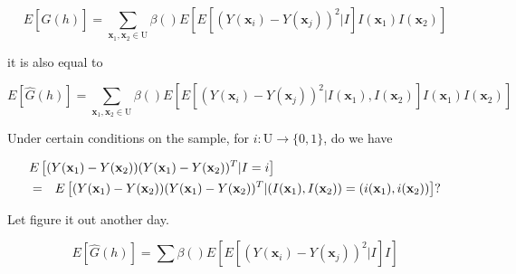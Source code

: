 \documentclass[12pt]{article}
\theoremstyle{definition}
\theoremstyle{remark}
\newcommand{\Pop}{\mathrm{U}}
\newcommand{\position}{\mathbf{x}}
\begin{document}
\begin{equation}
    E[\hat{G}(h)]=\sum_{\position_1,\position_2\in \Pop}{\beta()E\left[E\left[(Y(\mathbf{x}_{i})-Y(\mathbf{x}_{j}))^{2}|I\right]I(\position_1)I(\position_2)\right]}
\end{equation}

it is also equal to 


\begin{equation}
    E[\hat{G}(h)]=\sum_{\position_1,\position_2\in \Pop}{\beta()E\left[E\left[(Y(\mathbf{x}_{i})-Y(\mathbf{x}_{j}))^{2}|I(\position_1),I(\position_2)\right]I(\position_1)I(\position_2)\right]}
\end{equation}


Under certain conditions on the sample, for $i:\Pop\to\{0,1\}$, do we have 

\begin{eqnarray*}
\lefteqn{E\left[(Y(\mathbf{x}_{1})-Y(\mathbf{x}_{2}))(Y(\mathbf{x}_{1})-Y(\mathbf{x}_{2}))^T|I=i\right]}\\
&=&
E\left[(Y(\mathbf{x}_{1})-Y(\mathbf{x}_{2}))(Y(\mathbf{x}_{1})-Y(\mathbf{x}_{2}))^T|(I(\position_1),I(\position_2))=(i(\position_1),i(\position_2))\right]?\end{eqnarray*}

Let figure it out another day.


\begin{equation}
    E[\hat{G}(h)]=\sum{\beta()E\left[E\left[(Y(\mathbf{x}_{i})-Y(\mathbf{x}_{j}))^{2}|I\right]I\right]}
\end{equation}
\end{document}
